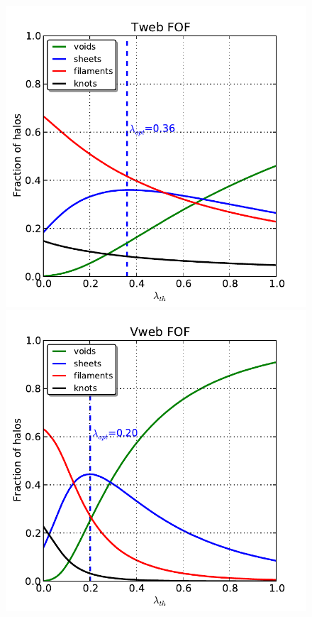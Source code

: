 \documentclass[a4,useAMS,usenatbib,usegraphicx]{latex/mn2e}
\begin{document}
\begin{flushleft}
\begin{figure}
\centering

  \includegraphics[trim = 0mm 0mm 5mm 5mm, clip, keepaspectratio=true,
  width=0.25\textheight]{./figures/halos_fraction_FOF_Tweb.pdf}  
  \includegraphics[trim = 0mm 0mm 5mm 5mm, clip, keepaspectratio=true,
  width=0.25\textheight]{./figures/halos_fraction_FOF_Vweb.pdf}


\end{figure}
\end{flushleft}
\end{document}
